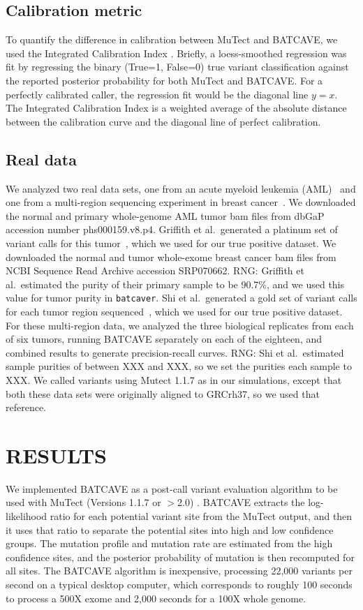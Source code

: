 \documentclass[a4,center,fleqn]{NAR}
\newcommand{\rngcomment}[1]{{\color{red}RNG: #1}}
\newcommand{\batcave}{BATCAVE\xspace}
\begin{document}
\subsection{Calibration metric}
To quantify the difference in calibration between MuTect and \batcave, we used the Integrated Calibration Index \cite{Austin2019}.
Briefly, a loess-smoothed regression was fit by regressing the binary (True=1, False=0) true variant classification against the reported posterior probability for both MuTect and \batcave.
For a perfectly calibrated caller, the regression fit would be the diagonal line $y=x$. 
The Integrated Calibration Index is a weighted average of the absolute distance between the calibration curve and the diagonal line of perfect calibration.

\subsection{Real data}
We analyzed two real data sets, one from an acute myeloid leukemia (AML)~\cite{Griffith2015} and one from a multi-region sequencing experiment in breast cancer~\cite{Shi2018}.
We downloaded the normal and primary whole-genome AML tumor bam files from dbGaP accession number phs000159.v8.p4.
Griffith et al.\ generated a platinum set of variant calls for this tumor~\cite{Griffith2015}, which we used for our true positive dataset.
We downloaded the normal and tumor whole-exome breast cancer bam files from NCBI Sequence Read Archive accession SRP070662.
\rngcomment{Griffith et al.\ estimated the purity of their primary sample to be 90.7\%, and we used this value for tumor purity in \texttt{batcaver}.}
Shi et al.\ generated a gold set of variant calls for each tumor region sequenced~\cite{Shi2018}, which we used for our true positive dataset.
For these multi-region data, we analyzed the three biological replicates from each of six tumors, running \batcave separately on each of the eighteen, and combined results to generate precision-recall curves.
\rngcomment{Shi et al.\ estimated sample purities of between XXX and XXX, so we set the purities each sample to XXX.}
We called variants using Mutect 1.1.7 as in our simulations, except that both these data sets were originally aligned to GRCrh37, so we used that reference.


\section{RESULTS}
We implemented \batcave as a post-call variant evaluation algorithm to be used with MuTect (Versions 1.1.7 or $>$2.0) \cite{Cibulskis2013}.
\batcave extracts the log-likelihood ratio for each potential variant site from the MuTect output, and then it uses that ratio to separate the potential sites into high and low confidence groups.
The mutation profile and mutation rate are estimated from the high confidence sites, and the posterior probability of mutation is then recomputed for all sites.
The \batcave algorithm is inexpensive, processing 22,000 variants per second on a typical desktop computer, which corresponds to roughly 100 seconds to process a 500X exome and 2,000 seconds for a 100X whole genome.
\end{document}
